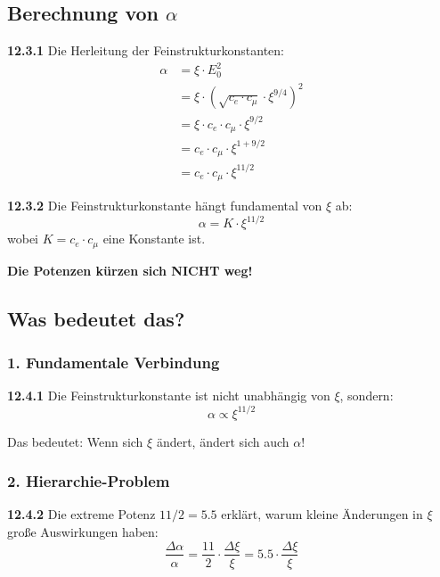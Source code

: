 \documentclass[12pt,a4paper]{article}
\begin{document}
\subsection{Berechnung von $\alpha$}

\noindent \textbf{12.3.1} Die Herleitung der Feinstrukturkonstanten:
\begin{align}
	\alpha &= \xi \cdot E_0^2 \\
	&= \xi \cdot (\sqrt{c_e \cdot c_\mu} \cdot \xi^{9/4})^2 \\
	&= \xi \cdot c_e \cdot c_\mu \cdot \xi^{9/2} \\
	&= c_e \cdot c_\mu \cdot \xi^{1 + 9/2} \\
	&= c_e \cdot c_\mu \cdot \xi^{11/2}
\end{align}

\begin{tcolorbox}[colback=red!5!white,colframe=red!75!black,title=\textbf{WICHTIGES ERGEBNIS}]
	\noindent \textbf{12.3.2} Die Feinstrukturkonstante hängt fundamental von $\xi$ ab:
	\begin{equation}
		\boxed{\alpha = K \cdot \xi^{11/2}}
	\end{equation}
	wobei $K = c_e \cdot c_\mu$ eine Konstante ist.
	
	\textbf{Die Potenzen kürzen sich NICHT weg!}
\end{tcolorbox}

\subsection{Was bedeutet das?}

\subsubsection{1. Fundamentale Verbindung}
\noindent \textbf{12.4.1} Die Feinstrukturkonstante ist nicht unabhängig von $\xi$, sondern:
\begin{equation}
	\alpha \propto \xi^{11/2}
\end{equation}

Das bedeutet: Wenn sich $\xi$ ändert, ändert sich auch $\alpha$!

\subsubsection{2. Hierarchie-Problem}
\noindent \textbf{12.4.2} Die extreme Potenz $11/2 = 5.5$ erklärt, warum kleine Änderungen in $\xi$ große Auswirkungen haben:
\begin{equation}
	\frac{\Delta \alpha}{\alpha} = \frac{11}{2} \cdot \frac{\Delta \xi}{\xi} = 5.5 \cdot \frac{\Delta \xi}{\xi}
\end{equation}
\end{document}
